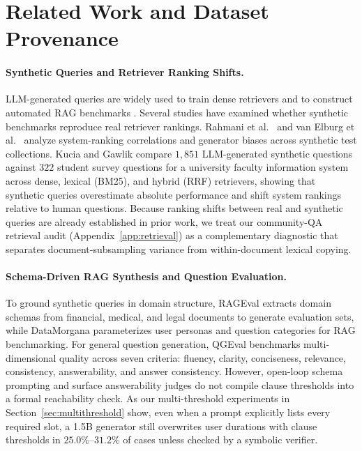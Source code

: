\documentclass[10pt,twocolumn]{article}
\renewcommand{\_}{\textunderscore\allowbreak}
\begin{document}
\section{Related Work and Dataset Provenance}

\paragraph{Synthetic Queries and Retriever Ranking Shifts.}
LLM-generated queries are widely used to train dense retrievers \cite{dai2023promptagator,jeronymo2023inparsv2} and to construct automated RAG benchmarks \cite{saadfalcon2024ares,es2024ragas}. Several studies have examined whether synthetic benchmarks reproduce real retriever rankings. Rahmani et al.\ \cite{rahmani2024syndl} and van Elburg et al.\ \cite{vanelburg2025synthetic} analyze system-ranking correlations and generator biases across synthetic test collections. Kucia and Gawlik \cite{kucia2026beyond} compare $1{,}851$ LLM-generated synthetic questions against $322$ student survey questions for a university faculty information system across dense, lexical (BM25), and hybrid (RRF) retrievers, showing that synthetic queries overestimate absolute performance and shift system rankings relative to human questions. Because ranking shifts between real and synthetic queries are already established in prior work, we treat our community-QA retrieval audit (Appendix~\ref{app:retrieval}) as a complementary diagnostic that separates document-subsampling variance from within-document lexical copying.

\paragraph{Schema-Driven RAG Synthesis and Question Evaluation.}
To ground synthetic queries in domain structure, RAGEval \cite{zhu2025rageval} extracts domain schemas from financial, medical, and legal documents to generate evaluation sets, while DataMorgana \cite{filice2025datamorgana} parameterizes user personas and question categories for RAG benchmarking. For general question generation, QGEval \cite{fu2024qgeval} benchmarks multi-dimensional quality across seven criteria: fluency, clarity, conciseness, relevance, consistency, answerability, and answer consistency. However, open-loop schema prompting and surface answerability judges do not compile clause thresholds into a formal reachability check. As our multi-threshold experiments in Section~\ref{sec:multithreshold} show, even when a prompt explicitly lists every required slot, a 1.5B generator still overwrites user durations with clause thresholds in $25.0\%\text{--}31.2\%$ of cases unless checked by a symbolic verifier.
\end{document}
